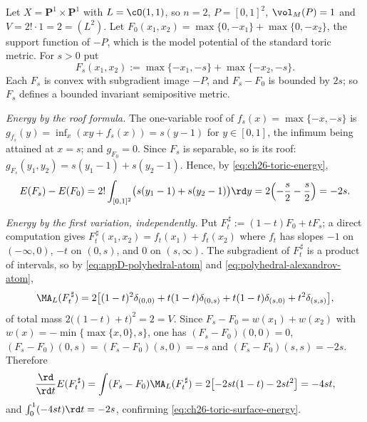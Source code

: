\begin{example}
\label{ex:ch26-toric-surface}
Let \(X=\mathbf P^1\times\mathbf P^1\) with \(L=\cO(1,1)\), so \(n=2\),
\(P=[0,1]^2\), \(\vol_M(P)=1\) and \(V=2!\cdot1=2=(L^2)\).  Let
\(F_0(x_1,x_2)=\max\{0,-x_1\}+\max\{0,-x_2\}\), the support function of
\(-P\), which is the model potential of the standard toric metric.  For
\(s>0\) put
\[
 F_s(x_1,x_2):=\max\{-x_1,-s\}+\max\{-x_2,-s\} .
\]
Each \(F_s\) is convex with subgradient image \(-P\), and \(F_s-F_0\) is
bounded by \(2s\); so \(F_s\) defines a bounded invariant semipositive metric.

\emph{Energy by the roof formula.}  The one-variable roof of
\(f_s(x)=\max\{-x,-s\}\) is
\(g_{f_s}(y)=\inf_x(xy+f_s(x))=s(y-1)\) for \(y\in[0,1]\), the infimum being
attained at \(x=s\); and \(g_{F_0}=0\).  Since \(F_s\) is separable, so is
its roof: \(g_{F_s}(y_1,y_2)=s(y_1-1)+s(y_2-1)\).  Hence, by
\eqref{eq:ch26-toric-energy},
\begin{equation}
\label{eq:ch26-toric-surface-energy}
 E(F_s)-E(F_0)
 =2!\int_{[0,1]^2}\bigl(s(y_1-1)+s(y_2-1)\bigr)\rd y
 =2\Bigl(-\frac s2-\frac s2\Bigr)=-2s .
\end{equation}

\emph{Energy by the first variation, independently.}  Put
\(F_t^{\,\sharp}:=(1-t)F_0+tF_s\); a direct computation gives
\(F_t^{\,\sharp}(x_1,x_2)=f_t(x_1)+f_t(x_2)\) where \(f_t\) has slopes
\(-1\) on \((-\infty,0)\), \(-t\) on \((0,s)\), and \(0\) on \((s,\infty)\).
The subgradient of \(F_t^{\,\sharp}\) is a product of intervals, so by
\eqref{eq:appD-polyhedral-atom} and \eqref{eq:polyhedral-alexandrov-atom},
\[
 \MA_L(F_t^{\,\sharp})
 =2\bigl[(1-t)^2\delta_{(0,0)}+t(1-t)\delta_{(0,s)}
        +t(1-t)\delta_{(s,0)}+t^2\delta_{(s,s)}\bigr],
\]
of total mass \(2\bigl((1-t)+t\bigr)^2=2=V\).  Since
\(F_s-F_0=w(x_1)+w(x_2)\) with \(w(x)=-\min\{\max\{x,0\},s\}\), one has
\((F_s-F_0)(0,0)=0\), \((F_s-F_0)(0,s)=(F_s-F_0)(s,0)=-s\) and
\((F_s-F_0)(s,s)=-2s\).  Therefore
\[
 \frac{\rd}{\rd t}E(F_t^{\,\sharp})
 =\int(F_s-F_0)\MA_L(F_t^{\,\sharp})
 =2\bigl[-2st(1-t)-2st^2\bigr]=-4st ,
\]
and \(\int_0^1(-4st)\rd t=-2s\), confirming
\eqref{eq:ch26-toric-surface-energy}.


\end{example}
